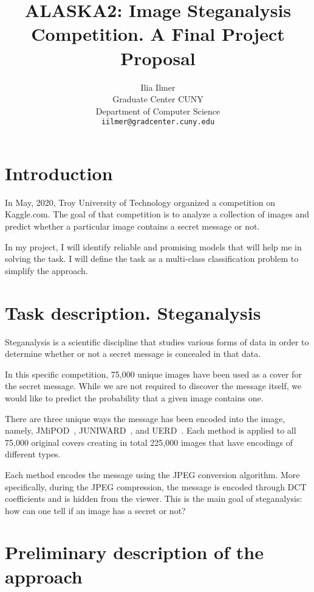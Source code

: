 \documentclass[letterpaper]{article}
\title{ALASKA2: Image Steganalysis Competition. A Final Project Proposal}
\author{
    Ilia Ilmer \\
  Graduate Center CUNY \\
  Department of Computer Science \\
  \texttt{iilmer@gradcenter.cuny.edu} \\
}
\begin{document}
\maketitle



\section{Introduction}

In May, 2020, Troy University of Technology organized a competition on Kaggle.com. The goal of that competition is to analyze a collection of images and predict whether a particular image contains a secret message or not.

In my project, I will identify reliable and promising models that will help me in solving the task. I will define the task as a multi-class classification problem to simplify the approach.
\section{Task description. Steganalysis}
Steganalysis is a scientific discipline that studies various forms of data in order to determine whether or not a secret message is concealed in that data.

In this specific competition, 75,000 unique images have been used as a cover for the secret message. While we are not required to discover the message itself, we would like to predict the probability that a given image contains one.

There are three unique ways the message has been encoded into the image, namely, JMiPOD~\cite{jmipod}, JUNIWARD~\cite{juniward}, and UERD~\cite{uerd}. Each method is applied to all 75,000 original covers creating in total 225,000 images that have encodings of different types.

Each method encodes the message using the JPEG conversion algorithm. More specifically, during the JPEG compression, the message is encoded through DCT coefficients and is hidden from the viewer. This is the main goal of steganalysis: how can one tell if an image has a secret or not?

\section{Preliminary description of the approach}
\end{document}
